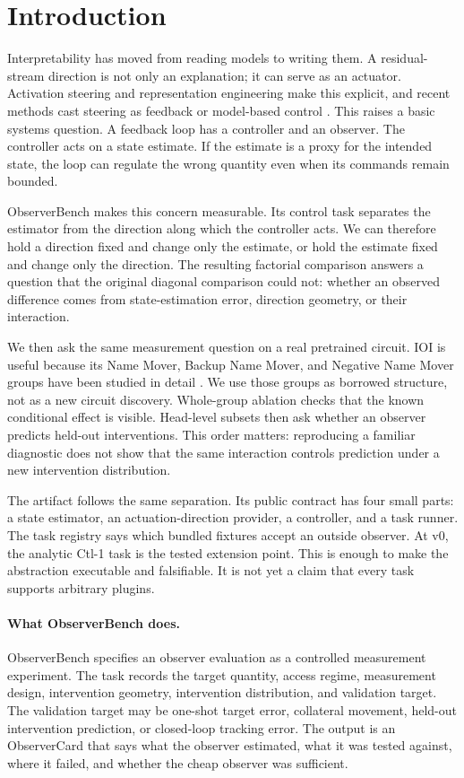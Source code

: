 \section{Introduction}

Interpretability has moved from reading models to writing them. A
residual-stream direction is not only an explanation; it can serve as an
actuator. Activation steering and representation engineering make this
explicit, and recent methods cast steering as feedback or model-based control
\cite{turner2023activation,zou2023representation,nguyen2025feedback,skifstad2026local}.
This raises a basic systems question. A feedback loop has a controller and an
observer. The controller acts on a state estimate. If the estimate is a proxy
for the intended state, the loop can regulate the wrong quantity even when its
commands remain bounded.

ObserverBench makes this concern measurable. Its control task separates the
estimator from the direction along which the controller acts. We can therefore
hold a direction fixed and change only the estimate, or hold the estimate fixed
and change only the direction. The resulting factorial comparison answers a
question that the original diagonal comparison could not: whether an observed
difference comes from state-estimation error, direction geometry, or their
interaction.

We then ask the same measurement question on a real pretrained circuit. IOI is
useful because its Name Mover, Backup Name Mover, and Negative Name Mover groups
have been studied in detail \cite{wang2023ioi,mcgrath2023hydra,mcdougall2023copy,rushing2024selfrepair}.
We use those groups as borrowed structure, not as a new circuit discovery.
Whole-group ablation checks that the known conditional effect is visible.
Head-level subsets then ask whether an observer predicts held-out
interventions. This order matters: reproducing a familiar diagnostic does not
show that the same interaction controls prediction under a new intervention
distribution.

The artifact follows the same separation. Its public contract has four small
parts: a state estimator, an actuation-direction provider, a controller, and a
task runner. The task registry says which bundled fixtures accept an outside
observer. At v0, the analytic Ctl-1 task is the tested extension point. This is
enough to make the abstraction executable and falsifiable. It is not yet a
claim that every task supports arbitrary plugins.

\paragraph{What ObserverBench does.}
ObserverBench specifies an observer evaluation as a controlled measurement
experiment. The task records the target quantity, access regime, measurement
design, intervention geometry, intervention distribution, and validation
target. The validation target may be one-shot target error, collateral
movement, held-out intervention prediction, or closed-loop tracking error. The
output is an ObserverCard that says what the observer estimated, what it was
tested against, where it failed, and whether the cheap observer was sufficient.

